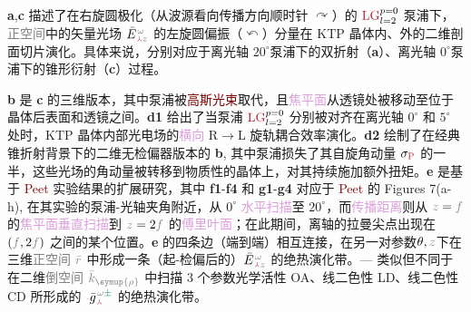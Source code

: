 \textbf{a},\textbf{c} 描述了在\textcolor{NavyBlue}{右旋圆极化}（从\textcolor{NavyBlue}{波源}看向传播方向顺时针 $\curvearrowright$）的 $\textcolor{Maroon}{\text{LG}}^{p=0}_{l=2}$ \textcolor{NavyBlue}{泵浦}下，\textcolor{gray}{正空间}中的\textcolor{PineGreen}{矢量光场} $\bar{E}^{\;\!\mathcolor{gray}{\omega}}_{\;\! \textcolor{Maroon}{\Yup} \mathcolor{gray}{z}}$ 的\textcolor{NavyBlue}{左旋圆偏振}（$\curvearrowleft$）分量在 KTP 晶体内、外的二维剖面切片演化。具体来说，分别对应于离\textcolor{PineGreen}{光轴} $20^\circ$泵浦下的\textcolor{PineGreen}{双折射}（\textbf{a}）、离\textcolor{PineGreen}{光轴} $0^\circ$泵浦下的\textcolor{PineGreen}{锥形衍射}（\textbf{c}）过程。

\textbf{b} 是 \textbf{c} 的三维版本，其中\textcolor{NavyBlue}{泵浦}被\textcolor{Maroon}{高斯光束}取代，且\textcolor{Plum}{焦平面}从透镜处被移动至位于晶体后表面和透镜之间。\textbf{d1} 给出了当\textcolor{NavyBlue}{泵浦} $\textcolor{Maroon}{\text{LG}}^{p=0}_{l=2}$ 分别被对齐在离\textcolor{PineGreen}{光轴} $0^\circ$ 和 $5^\circ$ 处时，KTP 晶体内部\textcolor{PineGreen}{光电场}的\textcolor{Plum}{横向} R$\to$L \textcolor{NavyBlue}{旋轨耦合}效率演化。\textbf{d2} 绘制了在经典\textcolor{PineGreen}{锥折射}背景下的二维\textcolor{PineGreen}{无检偏器}版本的 \textbf{b}, 其中\textcolor{NavyBlue}{泵浦}损失了其\textcolor{NavyBlue}{自旋角动量} $\sigma_{\textcolor{Maroon}{\text{P}}}$ 的一半，这些光场的\textcolor{NavyBlue}{角动量}被转移到物质性的晶体上，对其持续施加\textcolor{NavyBlue}{额外扭矩}\cite{berryOrbitalSpinAngular2005}。\textbf{e} 是基于 \textcolor{Maroon}{Peet} 实验结果的扩展研究，其中 \textbf{f1}-\textbf{f4} 和 \textbf{g1}-\textbf{g4} 对应于 \textcolor{Maroon}{Peet} 的 Figures 7(a-h)\cite{peetExperimentalStudyInternal2014}, 在其实验的\textcolor{NavyBlue}{泵浦}-\textcolor{PineGreen}{光轴}夹角附近，从 $0^\circ$ \textcolor{Plum}{水平扫描}至 $20^\circ$，而\textcolor{Plum}{传播距离}则从 $\mathcolor{gray}{z}=\mathcolor{gray}{f}$ 的\textcolor{Plum}{焦平面}\textcolor{Plum}{垂直扫描}到 $\mathcolor{gray}{z}=2\mathcolor{gray}{f}$ 的\textcolor{Plum}{傅里叶面}；在此期间，\textcolor{PineGreen}{离轴}的\textcolor{PineGreen}{拉曼尖点}出现在 $(\mathcolor{gray}{f},2\mathcolor{gray}{f})$ 之间的某个位置。\textbf{e} 的四条边（端到端）相互连接，在另一对参数$\theta,\mathcolor{gray}{z}$下在三维\textcolor{gray}{正空间} $\mathcolor{gray}{\bar{r}}$ 中形成一条（\textcolor{PineGreen}{起-检偏}后的）$\bar{E}^{\;\!\mathcolor{gray}{\omega}}_{\;\! \textcolor{Maroon}{\Yup} \mathcolor{gray}{z}}$ 的\textcolor{NavyBlue}{绝热演化}带。--- 类似但不同于  在二维\textcolor{gray}{倒空间} $\mathcolor{gray}{\bar{k}_{\symup{\rho}}}$ 中扫描 3 个参数\textcolor{NavyBlue}{光学活性 OA}、\textcolor{NavyBlue}{线二色性 LD}、\textcolor{NavyBlue}{线二色性 CD} 所形成的 $\Xint{{}^{}_{\mathcolor{gray}{-}}}{10}{\bar{g}}^{\;\!\mathcolor{gray}{\omega} \textcolor{PineGreen}{\pm}}_{\;\! \textcolor{Maroon}{\Yup}}$ 的\textcolor{NavyBlue}{绝热演化}带。

